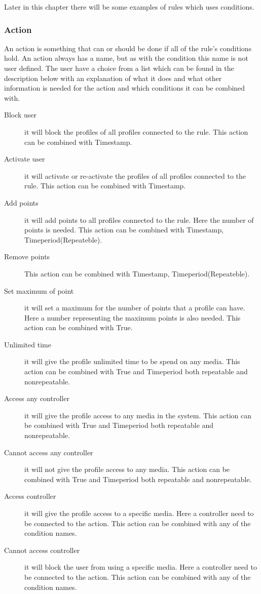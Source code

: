 Later in this chapter there will be some examples of rules which uses conditions.

\subsubsection{Action}
\label{subsubsection:action}
An action is something that can or should be done if all of the rule's conditions hold. An action always has a name, but as with the condition this name is not user defined. The user have a choice from a list which can be found in the description below with an explanation of what it does and what other information is needed for the action and which conditions it can be combined with.   

\begin{description}
	\item[Block user] it will block the profiles of all profiles connected to the rule. This action can be combined with Timestamp.
	\item[Activate user] it will activate or re-activate the profiles of all profiles connected to the rule. This action can be combined with Timestamp.
	\item[Add points] it will add points to all profiles connected to the rule. Here the number of points is needed. This action can be combined with Timestamp, Timeperiod(Repeateble).
	\item[Remove points]    This action can be combined with Timestamp, Timeperiod(Repeateble).
	\item[Set maximum of point] it will set a maximum for the number of points that a profile can have. Here a number representing the maximum points is also needed. This action can be combined with True.
	\item[Unlimited time] it will give the profile unlimited time to be spend on any media. This action can be combined with True and Timeperiod both repeatable and nonrepeatable.
	\item[Access any controller] it will give the profile access to any media in the system. This action can be combined with True and Timeperiod both repeatable and nonrepeatable.
	\item[Cannot access any controller] it will not give the profile access to any media. This action can be combined with True and Timeperiod both repeatable and nonrepeatable.
	\item[Access controller] it will give the profile access to a specific media. Here a controller need to be connected to the action. This action can be combined with any of the condition names.
	\item[Cannot access controller] it will block the user from using a specific media. Here a controller need to be connected to the action. This action can be combined with any of the condition names.
\end{description}
		
